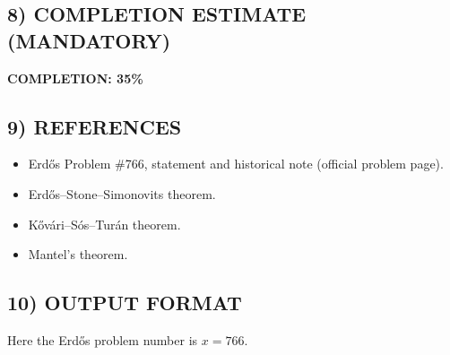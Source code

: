 \subsection*{8) COMPLETION ESTIMATE (MANDATORY)}
\textbf{COMPLETION: 35\%}

\subsection*{9) REFERENCES}
\begin{itemize}
\item Erd\H{o}s Problem \#766, statement and historical note (official problem page).
\item Erd\H{o}s--Stone--Simonovits theorem.
\item K\H{o}v\'ari--S\'os--Tur\'an theorem.
\item Mantel's theorem.
\end{itemize}

\subsection*{10) OUTPUT FORMAT}
Here the Erd\H{o}s problem number is $x=766$.
